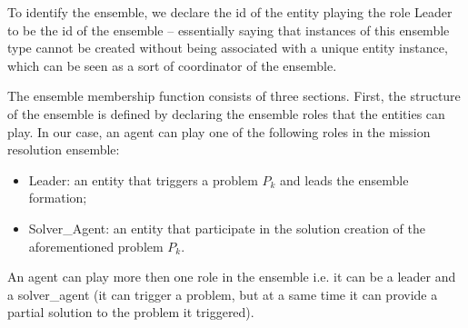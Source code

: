 \documentclass[journal]{IEEEtran}
\theoremstyle{definition}
\begin{document}
To identify the ensemble, we declare the id of the entity playing the role Leader to be the id of the ensemble – essentially
saying that instances of this ensemble type cannot be
created without being associated with a unique entity
instance, which can be seen as a sort of coordinator
of the ensemble.

The ensemble membership function 
consists of three sections. First, the
structure of the ensemble is defined by declaring the ensemble
roles that the entities can play.
In our case, an agent can play one of the following roles in the mission resolution ensemble:
\begin{itemize}
\item Leader: an entity that triggers a problem $P_k$ and leads the ensemble formation;
\item Solver\_Agent: an entity that participate in the solution creation of the aforementioned problem $P_k$.
\end{itemize}
An agent can play more then one role in the ensemble i.e. it can be a leader and a solver\_agent (it can trigger a problem, but at a same time it can provide a partial solution to the problem it triggered).
\end{document}
